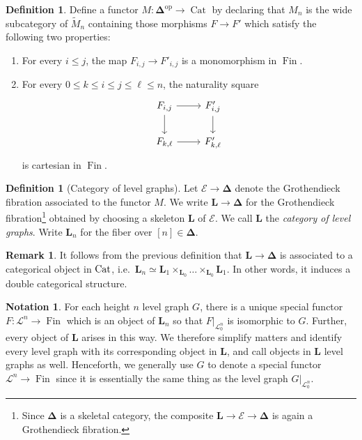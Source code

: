 \documentclass{amsart}
\numberwithin{theorem}{subsection}
\theoremstyle{definition}
\newtheorem{definition}[theorem]{Definition}
\newtheorem{notation}[theorem]{Notation}
\newtheorem{remark}[theorem]{Remark}
\providecommand{\op}{\mathrm{op}}
\newcommand{\finset}{\operatorname{Fin}}
\newcommand{\xCat}{\operatorname{Cat}}
\newcommand{\xE}{\mathcal{E}}
\newcommand{\name}[1]{\ensuremath{\text{\textup{#1}}}}
\newcommand{\simp}{\mathbf{\Delta}}
\newcommand{\levelg}{\mathbf{L}}
\newcommand{\Cat}{\name{Cat}}
\newcommand{\scriptyell}{\mathscr L}
\begin{document}
\begin{definition}\label{def M}
	Define a functor $M\colon \simp^\op\to \xCat$ by declaring that $M_n$ is the wide subcategory of $\widetilde{M}_n$ containing those morphisms $F\to F'$ which satisfy the following two properties:
	\begin{enumerate}
		\item For every $i\leq j$, the map $F_{i,j}\to F'_{i,j}$ is a monomorphism in $\finset$. \label{M def mono}
		\item For every $0\leq k\leq i\leq j\leq \ell\leq n$, the naturality square
		\begin{equation*}
		\begin{tikzcd}
		F_{i,j}\ar{r}\ar{d}& F'_{i,j}\ar {d}\\
		F_{k,\ell}\ar{r}& F'_{k,\ell}
		\end{tikzcd}
		\end{equation*}
		is cartesian in $\finset$. \label{M def cartesian}
	\end{enumerate}
\end{definition}


\begin{definition}[Category of level graphs]\label{def levelg}
Let $\xE\to \simp$ denote the Grothendieck fibration associated to the functor $M$.
We write $\levelg \to \simp$ for the Grothendieck fibration\footnote{Since $\simp$ is a skeletal category, the composite $\levelg \to \xE \to \simp$ is again a Grothendieck fibration.} obtained by choosing a skeleton $\levelg$ of $\xE$.
We call $\levelg$ the \emph{category of level graphs}.
Write $\levelg_n$ for the fiber over $[n] \in \simp$.
\end{definition}

\begin{remark}\label{rem doublecat}
It follows from the previous definition that $\levelg\to \simp$ is associated to a categorical object in $\Cat$, i.e.\ $\levelg_n\simeq \levelg_1\times_{\levelg_0}\ldots\times_{\levelg_0} \levelg_1$.
In other words, it induces a double categorical structure.
\end{remark}

\begin{notation}\label{not: check}
	For each height $n$ level graph $G$, there is a unique special functor $F \colon \scriptyell^n \to \finset$ which is an object of $\levelg_n$ so that $F|_{\scriptyell^n_0}$ is isomorphic to $G$.
	Further, every object of $\levelg$ arises in this way.
	We therefore simplify matters and identify every level graph with its corresponding object in $\levelg$, and call objects in $\levelg$ level graphs as well.
	Henceforth, we generally use $G$ to denote a special functor $\scriptyell^{n} \to \finset$ since it is essentially the same thing as the level graph $G|_{\scriptyell^n_0}$.
\end{notation}
\end{document}

